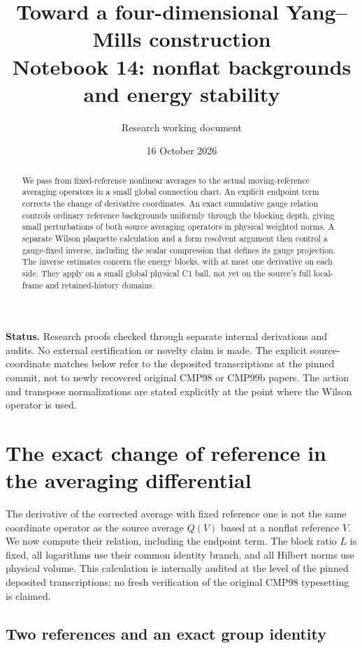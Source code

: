 \documentclass[11pt]{article}
\title{Toward a four-dimensional Yang--Mills construction\\
\large Notebook 14: nonflat backgrounds and energy stability}
\author{Research working document}
\date{16 October 2026}
\theoremstyle{remark}
\newcommand{\norm}[1]{\left\|#1\right\|}
\begin{document}
\maketitle
\begin{abstract}
We pass from fixed-reference nonlinear averages to the actual
moving-reference averaging operators in a small global connection
chart. An explicit endpoint term corrects the change of derivative
coordinates. An exact cumulative gauge relation controls ordinary
reference backgrounds uniformly through the blocking depth, giving
small perturbations of both source averaging operators in physical
weighted norms. A separate Wilson plaquette calculation and a form
resolvent argument then control a gauge-fixed inverse, including the
scalar compression that defines its gauge projection. The inverse
estimates concern the energy blocks, with at most one derivative on
each side. They apply on a small global physical C1 ball, not yet on
the source's full local-frame and retained-history domains.
\end{abstract}
\noindent\textbf{Status.}
Research proofs checked through separate internal derivations and
audits. No external certification or novelty claim is made. The
explicit source-coordinate matches below refer to the deposited
transcriptions at the pinned commit, not to newly recovered original
CMP98 or CMP99b papers. The action and transpose normalizations are
stated explicitly at the point where the Wilson operator is used.

\section{The exact change of reference in the averaging differential}
\label{nc-section}

The derivative of the corrected average with fixed reference one
is not the same coordinate operator as the source average $Q(V)$
based at a nonflat reference $V$. We now compute their relation,
including the endpoint term. The block ratio $L$ is fixed, all
logarithms use their common identity branch, and all Hilbert norms
use physical volume. This calculation is internally audited at the
level of the pinned deposited transcriptions; no fresh verification
of the original CMP98 typesetting is claimed.

\subsection{Two references and an exact group identity}
\label{nc-group}
\end{document}
